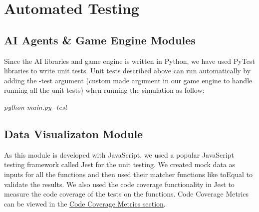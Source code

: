 \documentclass[12pt, titlepage]{article}
\begin{document}
\section{Automated Testing}
\subsection{AI Agents & Game Engine Modules}
Since the AI libraries and game engine is written in Python, we have used PyTest libraries to write unit tests. Unit tests described above can run automatically by adding the -test argument (custom made argument in our game engine to handle running all the unit tests) when running the simulation as follow:


\textit{python main.py -test}

\subsection{Data Visualizaton Module}
As this module is developed with JavaScript, we used a popular JavaScript testing framework called Jest for the unit testing. We created mock data as inputs for all the functions and then used their matcher functions like toEqual to validate the results. We also used the code coverage functionality in Jest to measure the code coverage of the tests on the functions. Code Coverage Metrics can be viewed in the \hyperref[Code Coverage Data Visualization]{Code Coverage Metrics section}.
\end{document}
